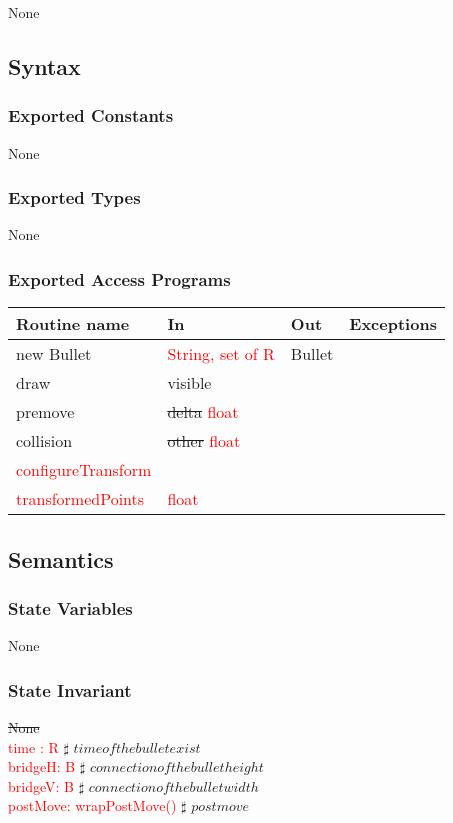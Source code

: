 \documentclass[12pt]{article}
\begin{document}
None

\subsection* {Syntax}

\subsubsection* {Exported Constants}

None

\subsubsection* {Exported Types}

None 

\subsubsection* {Exported Access Programs}

\begin{tabular}{| l | l | l | p{5cm} |}
\hline
\textbf{Routine name} & \textbf{In} & \textbf{Out} & \textbf{Exceptions}\\
\hline
new Bullet & \textcolor{red}{String, set of R} & Bullet  & ~\\
\hline
draw & visible & ~ & ~\\
\hline
premove & \sout{delta} \textcolor{red}{float} & ~  & ~\\
\hline
collision & \sout{other} \textcolor{red}{float} & ~ & ~ \\
\hline
\textcolor{red}{configureTransform} & ~ & ~ \\
\hline
\textcolor{red}{transformedPoints} & \textcolor{red}{float} & ~ \\
\hline
\end{tabular}

\subsection* {Semantics}

\subsubsection* {State Variables}
None


\subsubsection* {State Invariant}
\sout{None}\\
\textcolor{red}{time : R} $\sharp$ $time of the bullet exist $\\
\textcolor{red}{bridgeH: B} $\sharp$ $connection of the bullet height $\\
\textcolor{red}{bridgeV: B}  $\sharp$ $connection of the bullet width $\\
\textcolor{red}{postMove: wrapPostMove()}  $\sharp$ $postmove$\\
\end{document}
